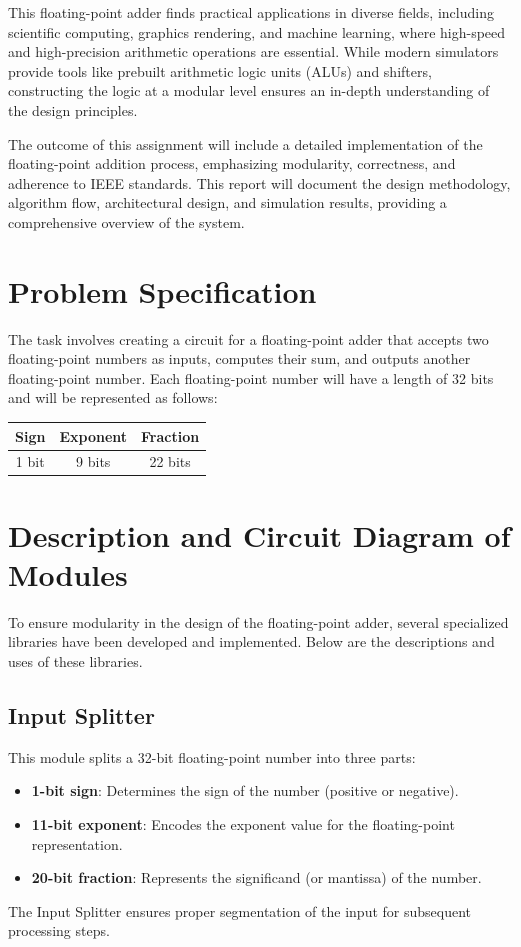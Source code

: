 \documentclass{article}
\begin{document}
This floating-point adder finds practical applications in diverse fields, including scientific computing, graphics rendering, and machine learning, where high-speed and high-precision arithmetic operations are essential. While modern simulators provide tools like prebuilt arithmetic logic units (ALUs) and shifters, constructing the logic at a modular level ensures an in-depth understanding of the design principles.

The outcome of this assignment will include a detailed implementation of the floating-point addition process, emphasizing modularity, correctness, and adherence to IEEE standards. This report will document the design methodology, algorithm flow, architectural design, and simulation results, providing a comprehensive overview of the system.


\section{Problem Specification}

The task involves creating a circuit for a floating-point adder that accepts two floating-point numbers as inputs, computes their sum, and outputs another floating-point number. Each floating-point number will have a length of 32 bits and will be represented as follows:

\begin{center}
    \begin{tabular}{|c|c|c|}
        \hline
        \textbf{Sign} & \textbf{Exponent} & \textbf{Fraction} \\ \hline
        1 bit         & 9 bits           & 22 bits           \\ \hline
    \end{tabular}
\end{center}


\section{ Description and Circuit Diagram of Modules}

To ensure modularity in the design of the floating-point adder, several specialized libraries have been developed and implemented. Below are the descriptions and uses of these libraries.

\subsection*{Input Splitter}
This module splits a 32-bit floating-point number into three parts:
\begin{itemize}
    \item \textbf{1-bit sign}: Determines the sign of the number (positive or negative).
    \item \textbf{11-bit exponent}: Encodes the exponent value for the floating-point representation.
    \item \textbf{20-bit fraction}: Represents the significand (or mantissa) of the number.
\end{itemize}
The Input Splitter ensures proper segmentation of the input for subsequent processing steps.
\end{document}
